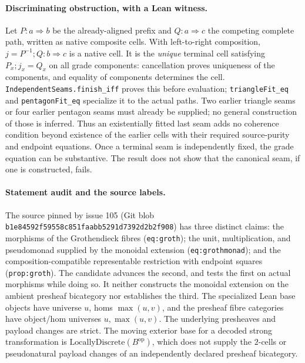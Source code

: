 \documentclass[11pt]{article}
\begin{document}
\paragraph{Discriminating obstruction, with a Lean witness.}
Let $P:a\Rightarrow b$ be the already-aligned prefix and $Q:a\Rightarrow c$
the competing complete path, written as native composite cells. With
left-to-right composition, $j=P^{-1};Q:b\Rightarrow c$ is a native cell.
It is the \emph{unique} terminal cell satisfying
$P_x;j_x=Q_x$ on all grade components: cancellation proves uniqueness of
the components, and equality of components determines the cell.
\texttt{IndependentSeams.finish\_iff} proves this before evaluation;
\texttt{triangleFit\_eq} and \texttt{pentagonFit\_eq} specialize it to the
actual paths. Two earlier triangle seams or four earlier pentagon seams must
already be supplied; no general construction of those is inferred. Thus an
existentially fitted last seam adds no coherence condition beyond existence
of the earlier cells with their required source-purity and endpoint equations. Once a terminal seam is independently fixed, the grade equation
can be substantive. The result does not show that the canonical seam, if
one is constructed, fails.
\paragraph{Statement audit and the source labels.}
The source pinned by issue 105 (Git blob \texttt{b1e84592f59558c851faabb5291d7392d2b2f908})
has three distinct claims: the morphisms of the Grothendieck fibres
(\texttt{eq:groth}); the unit, multiplication, and pseudomonad supplied by the
monoidal extension (\texttt{eq:grothmonad}); and the composition-compatible
representable restriction with endpoint squares (\texttt{prop:groth}). The
candidate advances the second, and tests the first on actual morphisms while
doing so. It neither constructs the monoidal extension on the ambient
presheaf bicategory nor establishes the third. The specialized Lean base
objects have universe $u$, homs $\max(u,v)$, and the presheaf fibre categories
have object/hom universes $u,\max(u,v)$. The underlying presheaves and
payload changes are strict. The moving exterior base for a decoded strong
transformation is $\mathrm{LocallyDiscrete}(B^{\mathrm{op}})$, which does not
supply the $2$-cells or pseudonatural payload changes of an independently
declared presheaf bicategory.
\end{document}
